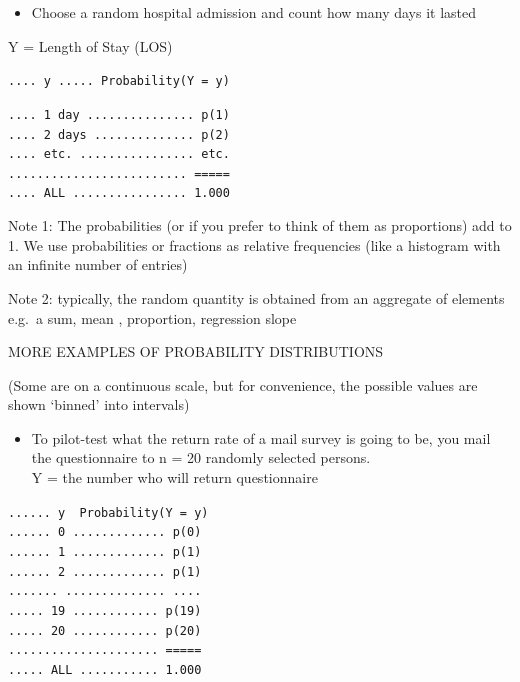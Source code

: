 \documentclass[]{book}
\providecommand{\tightlist}{%
  \setlength{\itemsep}{0pt}\setlength{\parskip}{0pt}}
\begin{document}
\begin{itemize}
\tightlist
\item
  Choose a random hospital admission and count how many days it lasted
\end{itemize}

Y = Length of Stay (LOS)

\texttt{....\ y\ .....\ Probability(Y\ =\ y)}

\texttt{....\ 1\ day\ ...............\ p(1)}\\
\texttt{....\ 2\ days\ ..............\ p(2)}~\\
\texttt{....\ etc.\ ................\ etc.}~\\
\texttt{.........................\ =====}~\\
\texttt{....\ ALL\ ................\ 1.000}

Note 1: The probabilities (or if you prefer to think of them as proportions) add to 1. We use probabilities or fractions as relative frequencies (like a histogram with an infinite number of entries)

Note 2: typically, the random quantity is obtained from an aggregate of elements e.g.~a sum, mean , proportion, regression slope

MORE EXAMPLES OF PROBABILITY DISTRIBUTIONS

(Some are on a continuous scale, but for convenience, the possible values are shown `binned' into intervals)

\begin{itemize}
\tightlist
\item
  To pilot-test what the return rate of a mail survey is going to be, you mail the questionnaire to n = 20 randomly selected persons.\\
  Y = the number who will return questionnaire
\end{itemize}

\texttt{......\ y\ \ Probability(Y\ =\ y)}\\
\texttt{......\ 0\ .............\ p(0)}~\\
\texttt{......\ 1\ .............\ p(1)}~\\
\texttt{......\ 2\ .............\ p(1)}~\\
\texttt{.......\ ..............\ ....}~\\
\texttt{.....\ 19\ ............\ p(19)}~\\
\texttt{.....\ 20\ ............\ p(20)}~\\
\texttt{.....................\ =====}~\\
\texttt{.....\ ALL\ ...........\ 1.000}
\end{document}
